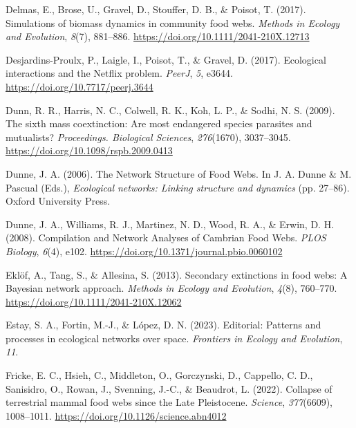 \documentclass[
]{article}
\newlength{\cslhangindent}
\newenvironment{CSLReferences}[2] %
 {\begin{list}{}{%
  \setlength{\itemindent}{0pt}
  \setlength{\leftmargin}{0pt}
  \setlength{\parsep}{0pt}
  \ifodd #1
   \setlength{\leftmargin}{\cslhangindent}
   \setlength{\itemindent}{-1\cslhangindent}
  \fi
  \setlength{\itemsep}{#2\baselineskip}}}
 {\end{list}}
\begin{document}
\begin{CSLReferences}{1}{0}
Delmas, E., Brose, U., Gravel, D., Stouffer, D. B., \& Poisot, T.
(2017). Simulations of biomass dynamics in community food webs.
\emph{Methods in Ecology and Evolution}, \emph{8}(7), 881--886.
\url{https://doi.org/10.1111/2041-210X.12713}

Desjardins-Proulx, P., Laigle, I., Poisot, T., \& Gravel, D. (2017).
Ecological interactions and the {Netflix} problem. \emph{PeerJ},
\emph{5}, e3644. \url{https://doi.org/10.7717/peerj.3644}

Dunn, R. R., Harris, N. C., Colwell, R. K., Koh, L. P., \& Sodhi, N. S.
(2009). The sixth mass coextinction: Are most endangered species
parasites and mutualists? \emph{Proceedings. Biological Sciences},
\emph{276}(1670), 3037--3045.
\url{https://doi.org/10.1098/rspb.2009.0413}

Dunne, J. A. (2006). The {Network Structure} of {Food Webs}. In J. A.
Dunne \& M. Pascual (Eds.), \emph{Ecological networks: {Linking}
structure and dynamics} (pp. 27--86). Oxford University Press.

Dunne, J. A., Williams, R. J., Martinez, N. D., Wood, R. A., \& Erwin,
D. H. (2008). Compilation and {Network Analyses} of {Cambrian Food
Webs}. \emph{PLOS Biology}, \emph{6}(4), e102.
\url{https://doi.org/10.1371/journal.pbio.0060102}

Eklöf, A., Tang, S., \& Allesina, S. (2013). Secondary extinctions in
food webs: A {Bayesian} network approach. \emph{Methods in Ecology and
Evolution}, \emph{4}(8), 760--770.
\url{https://doi.org/10.1111/2041-210X.12062}

Estay, S. A., Fortin, M.-J., \& López, D. N. (2023). Editorial:
{Patterns} and processes in ecological networks over space.
\emph{Frontiers in Ecology and Evolution}, \emph{11}.

Fricke, E. C., Hsieh, C., Middleton, O., Gorczynski, D., Cappello, C.
D., Sanisidro, O., Rowan, J., Svenning, J.-C., \& Beaudrot, L. (2022).
Collapse of terrestrial mammal food webs since the {Late Pleistocene}.
\emph{Science}, \emph{377}(6609), 1008--1011.
\url{https://doi.org/10.1126/science.abn4012}


\end{CSLReferences}
\end{document}
